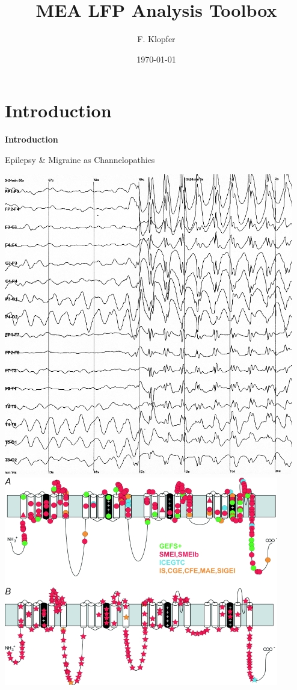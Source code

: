 \documentclass[10pt]{beamer}
\title{\textbf{MEA LFP Analysis Toolbox}}
\author{\vspace{-0.7cm}F. Klopfer}
\date{\today}
\begin{document}
\frame{\titlepage}

\section{Introduction}
\begin{frame}
\begin{center}
 \begin{Huge}
  \textbf{Introduction}
 \end{Huge}
 \end{center}
\end{frame}

\begin{frame}[allowframebreaks]{Epilepsy \& Migraine as Channelopathies}
    \begin{center}
  \includegraphics[keepaspectratio,width=0.48\framewidth]{img/0_channelo_epilepsy_eeg.png}
    \includegraphics[keepaspectratio,width=0.48\framewidth]{img/0_channelo_nav11.jpg}


\end{center}
\end{frame}
\end{document}
